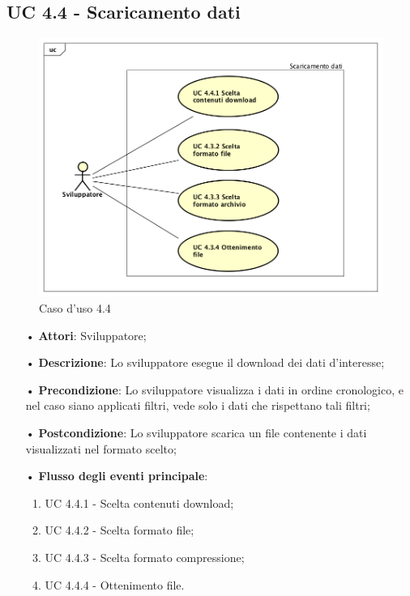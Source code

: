 \subsection{UC 4.4 - Scaricamento dati}
\begin{figure}[H]
\centering
\includegraphics[width=17cm]{img/UC440.png} 
\caption{Caso d'uso 4.4}\label{fig:440}
\end{figure}
\begin{itemize}
\item[•]\textbf{Attori}: Sviluppatore;
\item[•]\textbf{Descrizione}: Lo sviluppatore esegue il download dei dati d'interesse;
\item[•]\textbf{Precondizione}: Lo sviluppatore visualizza i dati in ordine cronologico, e nel caso siano applicati filtri, vede solo i dati che rispettano tali filtri;
\item[•]\textbf{Postcondizione}:  Lo sviluppatore scarica un file contenente i dati visualizzati nel formato scelto;
\item[•]\textbf{Flusso degli eventi principale}:
\begin{enumerate}
\item UC 4.4.1 - Scelta contenuti download;
\item UC 4.4.2 - Scelta formato file;
\item UC 4.4.3 - Scelta formato compressione;
\item UC 4.4.4 - Ottenimento file.
\end{enumerate}
\end{itemize}

